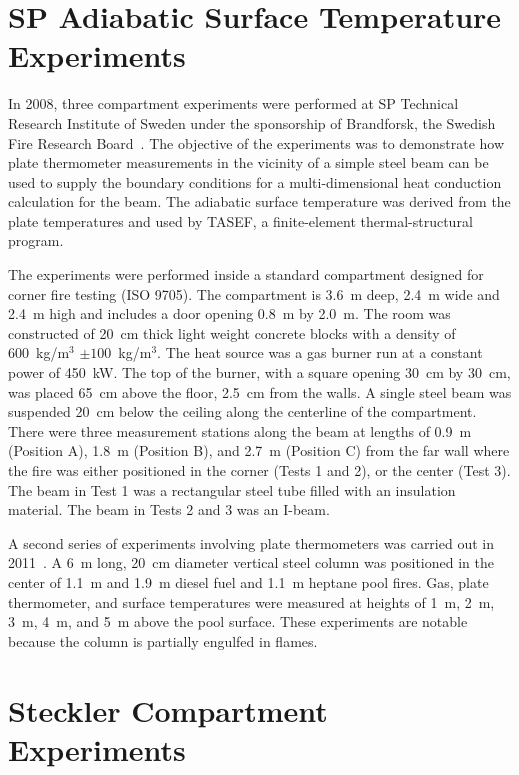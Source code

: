 \section{SP Adiabatic Surface Temperature Experiments}

In 2008, three compartment experiments were performed at SP Technical Research Institute of Sweden under the sponsorship of Brandforsk, the Swedish Fire Research Board~\cite{Wickstrom_AST}. The
objective of the experiments was to demonstrate how plate thermometer measurements in the vicinity of a simple steel beam can be used to supply the boundary conditions
for a multi-dimensional heat conduction calculation for the beam. The adiabatic surface temperature was derived from the plate temperatures and used by TASEF, a finite-element
thermal-structural program.

The experiments were performed inside a standard compartment designed for corner fire testing (ISO 9705).
The compartment is 3.6~m deep, 2.4~m wide and 2.4~m high and includes a door opening 0.8~m by 2.0~m. The room was constructed of 20~cm thick light weight concrete
blocks with a density of 600~kg/m$^3$ $\pm 100$~kg/m$^3$.
The heat source was a gas burner run at a constant power of 450~kW. The top of the burner, with a square opening 30~cm by 30~cm, was placed 65~cm above the floor, 2.5~cm from the walls.
A single steel beam was suspended 20~cm below the ceiling
along the centerline of the compartment. There were three measurement stations along the beam at lengths of 0.9~m (Position A), 1.8~m (Position B), and
2.7~m (Position C) from the far wall where the fire was either positioned in the corner (Tests 1 and 2), or the center (Test 3). The beam in Test 1 was
a rectangular steel tube filled with an insulation material. The beam in Tests 2 and 3 was an I-beam.

A second series of experiments involving plate thermometers was carried out in 2011~\cite{Sjostrom:AST}.
A 6~m long, 20~cm diameter vertical steel column was positioned in the center of 1.1~m and 1.9~m diesel fuel and 1.1~m heptane
pool fires. Gas, plate thermometer, and surface temperatures were measured at heights of 1~m, 2~m, 3~m, 4~m, and 5~m above the pool surface. These experiments are notable because
the column is partially engulfed in flames.




\section{Steckler Compartment Experiments}

